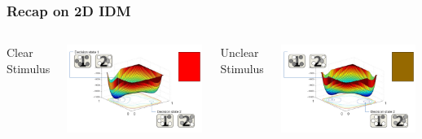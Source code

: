 \documentclass[xcolor={fixpdftex,hyperref,x11names},10pt,pdftex,hyperref={pdftex}]{beamer}
\begin{document}
\begin{frame}
	\frametitle{Recap on 2D IDM}

\begin{columns}
		Clear Stimulus
	\begin{center}
		\includegraphics[width=0.99\textwidth]{figs/clear-stim.png}
	\end{center}

		Unclear Stimulus
    		\begin{center}
			\includegraphics[width=0.99\textwidth]{figs/unclear-stim.png}
		\end{center}

\end{columns}

\end{frame}

\end{document}

